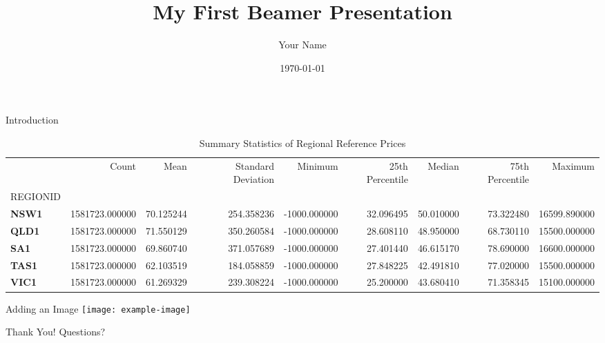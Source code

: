 \documentclass{beamer} %
\title{My First Beamer Presentation}
\author{Your Name}
\date{\today}
\begin{document}
\begin{frame}
    \titlepage
\end{frame}

\begin{frame}{Introduction} %

\begin{table}
\caption{Summary Statistics of Regional Reference Prices}
\label{tab:summary_stats}
\begin{tabular}{lrrrrrrrr}
\toprule
 & Count & Mean & Standard Deviation & Minimum & 25th Percentile & Median & 75th Percentile & Maximum \\
REGIONID &  &  &  &  &  &  &  &  \\
\midrule
\textbf{NSW1} & 1581723.000000 & 70.125244 & 254.358236 & -1000.000000 & 32.096495 & 50.010000 & 73.322480 & 16599.890000 \\
\textbf{QLD1} & 1581723.000000 & 71.550129 & 350.260584 & -1000.000000 & 28.608110 & 48.950000 & 68.730110 & 15500.000000 \\
\textbf{SA1} & 1581723.000000 & 69.860740 & 371.057689 & -1000.000000 & 27.401440 & 46.615170 & 78.690000 & 16600.000000 \\
\textbf{TAS1} & 1581723.000000 & 62.103519 & 184.058859 & -1000.000000 & 27.848225 & 42.491810 & 77.020000 & 15500.000000 \\
\textbf{VIC1} & 1581723.000000 & 61.269329 & 239.308224 & -1000.000000 & 25.200000 & 43.680410 & 71.358345 & 15100.000000 \\
\bottomrule
\end{tabular}
\end{table}
\end{frame}

\begin{frame}{Adding an Image}
    \texttt{[image: example-image]}
    \caption{Example Image}
\end{frame}

\begin{frame}{Thank You!}
    \centering
    Questions?
\end{frame}
\end{document}
